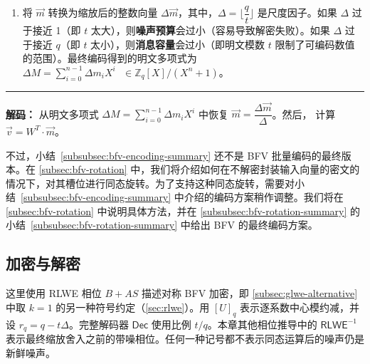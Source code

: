 \begin{tcolorbox}[title={\textbf{\tboxlabel{\ref*{subsubsec:bfv-encoding-summary}} BFV 的编码与解码}}]
\begin{enumerate}
$ $

\item 将 $\vec{m}$ 转换为缩放后的整数向量 $\Delta\vec{m}$，其中，$\Delta=\lfloor \dfrac{q}{t}\rfloor$ 是尺度因子。如果 $\Delta$ 过于接近 1（即 $t$ 太大），则\textbf{噪声预算}会过小（容易导致解密失败）。如果 $\Delta$ 过于接近 $q$（即 $t$ 太小），则\textbf{消息容量}会过小（即明文模数 $t$ 限制了可编码数值的范围）。最终编码得到的明文多项式为 $\Delta M = \sum\limits_{i=0}^{n-1} \Delta m_i X^i \text{ } \in \mathbb{Z}_q[X] / (X^n + 1)$。 %

\end{enumerate}

\par\noindent\rule{\textwidth}{0.4pt}

\textbf{\underline{解码}：} 从明文多项式 $\Delta M = \sum\limits_{i=0}^{n-1}\Delta m_iX^i$ 中恢复 $\vec{m} = \dfrac{\Delta \vec{m}}{\Delta}$。然后，
计算 $\vec{v} = W^T \cdot \vec{m}$。

\end{tcolorbox}



不过，小结~\ref*{subsubsec:bfv-encoding-summary} 还不是 BFV 批量编码的最终版本。在 \autoref{subsec:bfv-rotation} 中，我们将介绍如何在不解密封装输入向量的密文的情况下，对其槽位进行同态旋转。为了支持这种同态旋转，需要对小结~\ref*{subsubsec:bfv-encoding-summary} 中介绍的编码方案稍作调整。我们将在 \autoref{subsec:bfv-rotation} 中说明具体方法，并在 \autoref{subsubsec:bfv-rotation-summary} 的小结~\ref*{subsubsec:bfv-rotation-summary} 中给出 BFV 的最终编码方案。


\subsection{加密与解密}
\label{subsec:bfv-enc-dec}

这里使用 RLWE 相位 $B+AS$ 描述对称 BFV 加密，即 \autoref{subsec:glwe-alternative} 中取 $k=1$ 的另一种符号约定（\autoref{sec:rlwe}）。用 $[U]_q$ 表示逐系数中心模约减，并设 $r_q=q-t\Delta$。完整解码器 $\textsf{Dec}$ 使用比例 $t/q$。本章其他相位推导中的 $\textsf{RLWE}^{-1}$ 表示最终缩放舍入之前的带噪相位。任何一种记号都不表示同态运算后的噪声仍是新鲜噪声。



